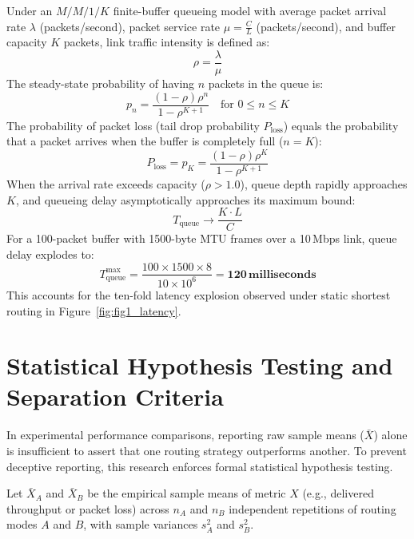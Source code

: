 Under an $M/M/1/K$ finite-buffer queueing model with average packet arrival rate $\lambda$ (packets/second), packet service rate $\mu = \frac{C}{L}$ (packets/second), and buffer capacity $K$ packets, link traffic intensity is defined as:
\begin{equation}
  \rho = \frac{\lambda}{\mu}
\end{equation}
The steady-state probability of having $n$ packets in the queue is:
\begin{equation}
  p_n = \frac{(1 - \rho)\rho^n}{1 - \rho^{K+1}} \quad \text{for } 0 \le n \le K
\end{equation}
The probability of packet loss (tail drop probability $P_{\text{loss}}$) equals the probability that a packet arrives when the buffer is completely full ($n = K$):
\begin{equation}
  P_{\text{loss}} = p_K = \frac{(1 - \rho)\rho^K}{1 - \rho^{K+1}}
\end{equation}
When the arrival rate exceeds capacity ($\rho > 1.0$), queue depth rapidly approaches $K$, and queueing delay asymptotically approaches its maximum bound:
\begin{equation}
  T_{\text{queue}} \longrightarrow \frac{K \cdot L}{C}
\end{equation}
For a 100-packet buffer with 1500-byte MTU frames over a 10\,Mbps link, queue delay explodes to:
\begin{equation}
  T_{\text{queue}}^{\text{max}} = \frac{100 \times 1500 \times 8}{10 \times 10^6} = \mathbf{120\,\text{milliseconds}}
\end{equation}
This accounts for the ten-fold latency explosion observed under static shortest routing in Figure~\ref{fig:fig1_latency}.

\section{Statistical Hypothesis Testing and Separation Criteria}
In experimental performance comparisons, reporting raw sample means ($\bar{X}$) alone is insufficient to assert that one routing strategy outperforms another. To prevent deceptive reporting, this research enforces formal statistical hypothesis testing.

Let $\bar{X}_A$ and $\bar{X}_B$ be the empirical sample means of metric $X$ (e.g., delivered throughput or packet loss) across $n_A$ and $n_B$ independent repetitions of routing modes $A$ and $B$, with sample variances $s_A^2$ and $s_B^2$.

